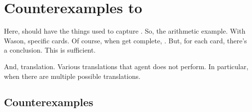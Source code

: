 \chapter{Counterexamples to \issueInclusion{}}
\label{cha:ces}


\begin{note}
  Here, should have the things used to capture \tCV{}.
  So, the arithmetic example.
  With Wason, specific cards.
  Of course, when get complete, \wit{}.
  But, for each card, there's a conclusion.
  This is sufficient.

  And, translation.
  Various translations that agent does not perform.
  In particular, when there are multiple possible translations.
\end{note}


\section{Counterexamples}
\label{sec:counterexamples}



